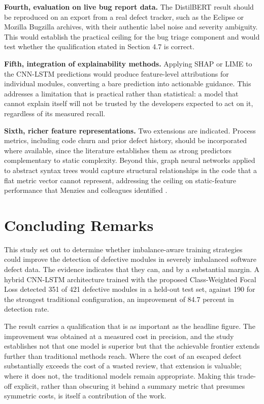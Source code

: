 \documentclass[12pt,a4paper,oneside]{report}
\begin{document}
\textbf{Fourth, evaluation on live bug report data.} The DistilBERT result should be reproduced on an export from a real defect tracker, such as the Eclipse or Mozilla Bugzilla archives, with their authentic label noise and severity ambiguity. This would establish the practical ceiling for the bug triage component and would test whether the qualification stated in Section 4.7 is correct.

\textbf{Fifth, integration of explainability methods.} Applying SHAP or LIME to the CNN-LSTM predictions would produce feature-level attributions for individual modules, converting a bare prediction into actionable guidance. This addresses a limitation that is practical rather than statistical: a model that cannot explain itself will not be trusted by the developers expected to act on it, regardless of its measured recall.

\textbf{Sixth, richer feature representations.} Two extensions are indicated. Process metrics, including code churn and prior defect history, should be incorporated where available, since the literature establishes them as strong predictors complementary to static complexity. Beyond this, graph neural networks applied to abstract syntax trees would capture structural relationships in the code that a flat metric vector cannot represent, addressing the ceiling on static-feature performance that Menzies and colleagues identified \cite{menzies2010}.

\section{Concluding Remarks}

This study set out to determine whether imbalance-aware training strategies could improve the detection of defective modules in severely imbalanced software defect data. The evidence indicates that they can, and by a substantial margin. A hybrid CNN-LSTM architecture trained with the proposed Class-Weighted Focal Loss detected 351 of 421 defective modules in a held-out test set, against 190 for the strongest traditional configuration, an improvement of 84.7 percent in detection rate.

The result carries a qualification that is as important as the headline figure. The improvement was obtained at a measured cost in precision, and the study establishes not that one model is superior but that the achievable frontier extends further than traditional methods reach. Where the cost of an escaped defect substantially exceeds the cost of a wasted review, that extension is valuable; where it does not, the traditional models remain appropriate. Making this trade-off explicit, rather than obscuring it behind a summary metric that presumes symmetric costs, is itself a contribution of the work.
\end{document}
